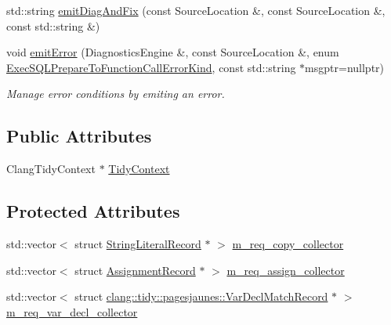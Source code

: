 \begin{DoxyCompactItemize}
std\+::string \hyperlink{classclang_1_1tidy_1_1pagesjaunes_1_1_exec_s_q_l_prepare_to_function_call_a75ae581d7112559add71e34482ca8566}{emit\+Diag\+And\+Fix} (const Source\+Location \&, const Source\+Location \&, const std\+::string \&)
\item 
void \hyperlink{classclang_1_1tidy_1_1pagesjaunes_1_1_exec_s_q_l_prepare_to_function_call_a86fd460de74f1414467ab71679af689d}{emit\+Error} (Diagnostics\+Engine \&, const Source\+Location \&, enum \hyperlink{classclang_1_1tidy_1_1pagesjaunes_1_1_exec_s_q_l_prepare_to_function_call_aad482f6245dde23a3092cf1156b614d9}{Exec\+S\+Q\+L\+Prepare\+To\+Function\+Call\+Error\+Kind}, const std\+::string $\ast$msgptr=nullptr)
\begin{DoxyCompactList}\small\item\em Manage error conditions by emiting an error. \end{DoxyCompactList}\end{DoxyCompactItemize}
\subsection*{Public Attributes}
\begin{DoxyCompactItemize}
\item 
Clang\+Tidy\+Context $\ast$ \hyperlink{classclang_1_1tidy_1_1pagesjaunes_1_1_exec_s_q_l_prepare_to_function_call_ade8961a6f1568823b03d01310daf9cb8}{Tidy\+Context}
\end{DoxyCompactItemize}
\subsection*{Protected Attributes}
\begin{DoxyCompactItemize}
\item 
std\+::vector$<$ struct \hyperlink{structclang_1_1tidy_1_1pagesjaunes_1_1_exec_s_q_l_prepare_to_function_call_1_1_string_literal_record}{String\+Literal\+Record} $\ast$ $>$ \hyperlink{classclang_1_1tidy_1_1pagesjaunes_1_1_exec_s_q_l_prepare_to_function_call_a3825367a306da6ebfda8f9f5faf34321}{m\+\_\+req\+\_\+copy\+\_\+collector}
\item 
std\+::vector$<$ struct \hyperlink{structclang_1_1tidy_1_1pagesjaunes_1_1_exec_s_q_l_prepare_to_function_call_1_1_assignment_record}{Assignment\+Record} $\ast$ $>$ \hyperlink{classclang_1_1tidy_1_1pagesjaunes_1_1_exec_s_q_l_prepare_to_function_call_a8c817b1b05e39f55eec0aeeebc91294d}{m\+\_\+req\+\_\+assign\+\_\+collector}
\item 
std\+::vector$<$ struct \hyperlink{structclang_1_1tidy_1_1pagesjaunes_1_1_var_decl_match_record}{clang\+::tidy\+::pagesjaunes\+::\+Var\+Decl\+Match\+Record} $\ast$ $>$ \hyperlink{classclang_1_1tidy_1_1pagesjaunes_1_1_exec_s_q_l_prepare_to_function_call_a4118e1f3b0dafefbc916d9f020c1e0f4}{m\+\_\+req\+\_\+var\+\_\+decl\+\_\+collector}
\end{DoxyCompactItemize}


